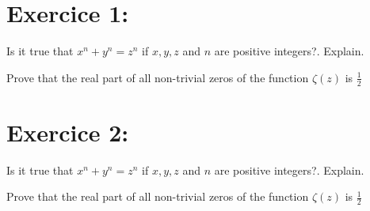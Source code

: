 \documentclass{exam}
\begin{document}
\begin{center}
\end{center}

\vspace{5mm}
\vspace{0.5in}

\section{Exercice 1: }
\begin{questions}
\question [10]
Is it true that \(x^n + y^n = z^n\) if \(x,y,z\) and \(n\) are
positive integers?. Explain.

\vspace{3in}

\question Prove that the real part of all non-trivial zeros of the function
\(\zeta(z)\) is \(\frac{1}{2}\)
\end{questions}

\section{Exercice 2: }
\begin{questions}
\question [10]
Is it true that \(x^n + y^n = z^n\) if \(x,y,z\) and \(n\) are
positive integers?. Explain.

\vspace{3in}

\question Prove that the real part of all non-trivial zeros of the function
\(\zeta(z)\) is \(\frac{1}{2}\)
\end{questions}
\end{document}
